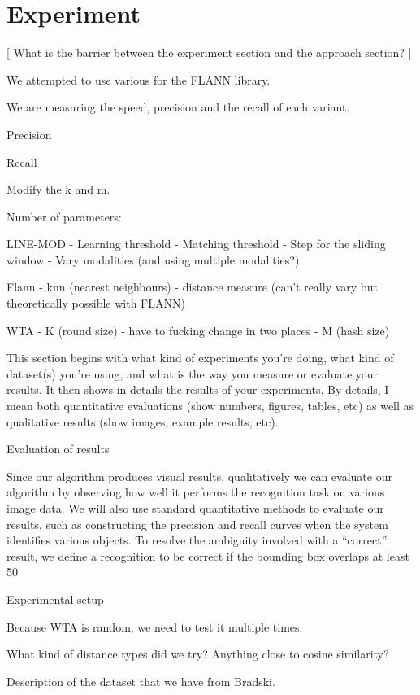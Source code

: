 \documentclass[10pt,twocolumn,letterpaper]{article}
\begin{document}
\section{Experiment}

[ What is the barrier between the experiment section and the approach section? ]

We attempted to use various for the FLANN library.

We are measuring the speed, precision and the recall of each variant.

Precision

Recall

Modify the k and m.

Number of parameters:

LINE-MOD
	- Learning threshold
	- Matching threshold
	- Step for the sliding window
	- Vary modalities (and using multiple modalities?)

Flann
	- knn (nearest neighbours)
	- distance measure (can't really vary but theoretically possible with FLANN)

WTA
	- K (round size) - have to fucking change in two places
	- M (hash size) 


This section begins with what kind of experiments you're doing, what kind of dataset(s) you're using, and what is the way you measure or evaluate your results. It then shows in details the results of your experiments. By details, I mean both quantitative evaluations (show numbers, figures, tables, etc) as well as qualitative results (show images, example results, etc).


Evaluation of results

Since our algorithm produces visual results, qualitatively we can evaluate our algorithm by observing how well it performs the recognition task on various image data. We will also use standard quantitative methods to evaluate our results, such as constructing the precision and recall curves when the system identifies various objects. To resolve the ambiguity involved with a “correct” result, we deﬁne a recognition to be correct if the bounding box overlaps at least 50%

Experimental setup

Because WTA is random, we need to test it multiple times.


What kind of distance types did we try? Anything close to cosine similarity?

Description of the dataset that we have from Bradski. 
\end{document}
